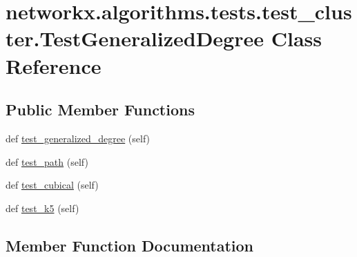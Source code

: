 \hypertarget{classnetworkx_1_1algorithms_1_1tests_1_1test__cluster_1_1TestGeneralizedDegree}{}\section{networkx.\+algorithms.\+tests.\+test\+\_\+cluster.\+Test\+Generalized\+Degree Class Reference}
\label{classnetworkx_1_1algorithms_1_1tests_1_1test__cluster_1_1TestGeneralizedDegree}
\subsection*{Public Member Functions}
\begin{DoxyCompactItemize}
\item 
def \hyperlink{classnetworkx_1_1algorithms_1_1tests_1_1test__cluster_1_1TestGeneralizedDegree_a8df473c0a718a59692de5cc19f2f118c}{test\+\_\+generalized\+\_\+degree} (self)
\item 
def \hyperlink{classnetworkx_1_1algorithms_1_1tests_1_1test__cluster_1_1TestGeneralizedDegree_ab949ca731c1b722c699b60a01a1737e6}{test\+\_\+path} (self)
\item 
def \hyperlink{classnetworkx_1_1algorithms_1_1tests_1_1test__cluster_1_1TestGeneralizedDegree_add8356ab2672f88d28f6aa5e7405864c}{test\+\_\+cubical} (self)
\item 
def \hyperlink{classnetworkx_1_1algorithms_1_1tests_1_1test__cluster_1_1TestGeneralizedDegree_af7c20450daf5e4ed33f868df527f3825}{test\+\_\+k5} (self)
\end{DoxyCompactItemize}


\subsection{Member Function Documentation}
\mbox{\label{classnetworkx_1_1algorithms_1_1tests_1_1test__cluster_1_1TestGeneralizedDegree_add8356ab2672f88d28f6aa5e7405864c}} 
